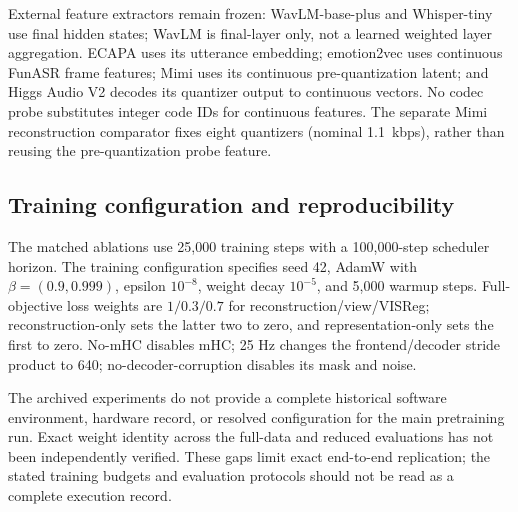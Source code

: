 \documentclass[11pt,a4paper]{article}
\begin{document}
External feature extractors remain frozen: WavLM-base-plus and Whisper-tiny use final hidden states; WavLM is final-layer only, not a learned weighted layer aggregation. ECAPA uses its utterance embedding; emotion2vec uses continuous FunASR frame features; Mimi uses its continuous pre-quantization latent; and Higgs Audio V2 decodes its quantizer output to continuous vectors. No codec probe substitutes integer code IDs for continuous features. The separate Mimi reconstruction comparator fixes eight quantizers (nominal 1.1~kbps), rather than reusing the pre-quantization probe feature.

\subsection{Training configuration and reproducibility}

The matched ablations use 25,000 training steps with a 100,000-step scheduler horizon. The training configuration specifies seed 42, AdamW with $\beta=(0.9,0.999)$, epsilon $10^{-8}$, weight decay $10^{-5}$, and 5,000 warmup steps. Full-objective loss weights are $1/0.3/0.7$ for reconstruction/view/VISReg; reconstruction-only sets the latter two to zero, and representation-only sets the first to zero. No-mHC disables mHC; 25 Hz changes the frontend/decoder stride product to 640; no-decoder-corruption disables its mask and noise.

The archived experiments do not provide a complete historical software environment, hardware record, or resolved configuration for the main pretraining run. Exact weight identity across the full-data and reduced evaluations has not been independently verified. These gaps limit exact end-to-end replication; the stated training budgets and evaluation protocols should not be read as a complete execution record.
\end{document}
